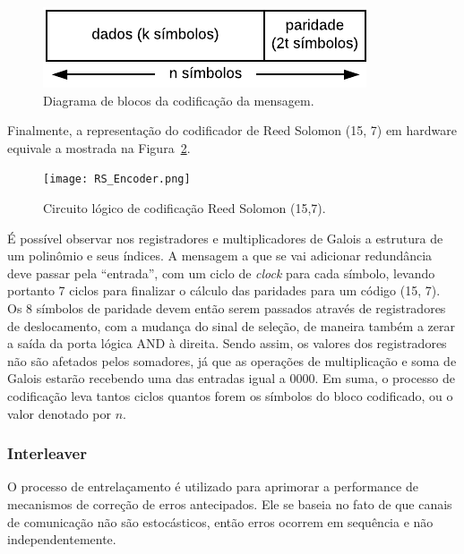 	\begin{figure}[!htb]
		\caption{\label{fig_reed_solomon_message}Diagrama de blocos da codificação da mensagem.}
		\centering
		\includegraphics[width=0.4\textheight]{frame/rs-codeword.pdf}
	\end{figure}

	Finalmente, a representação do codificador de Reed Solomon (15, 7) em hardware equivale a mostrada na Figura~\ref{fig:reedsolomon}.

	\begin{figure}[!htb]
		\caption{\label{RS_encoder_logic}Circuito lógico de codificação Reed Solomon (15,7).}
		\centering
		\texttt{[image: RS\_Encoder.png]}
		\label{fig:reedsolomon}
	\end{figure}

	É possível observar nos registradores e multiplicadores de Galois a estrutura de um polinômio e seus índices. A mensagem a que se vai adicionar redundância deve passar pela ``entrada'', com um ciclo de \textit{clock} para cada símbolo, levando portanto 7 ciclos para finalizar o cálculo das paridades para um código (15, 7). Os 8 símbolos de paridade devem então serem passados através de registradores de deslocamento, com a mudança do sinal de seleção, de maneira também a zerar a saída da porta lógica AND à direita. Sendo assim, os valores dos registradores não são afetados pelos somadores, já que as operações de multiplicação e soma de Galois estarão recebendo uma das entradas igual a 0000. Em suma, o processo de codificação leva tantos ciclos quantos forem os símbolos do bloco codificado, ou o valor denotado por $n$.


	\subsubsection{Interleaver}

	O processo de entrelaçamento é utilizado para aprimorar a performance de mecanismos de correção de erros antecipados. Ele se baseia no fato de que canais de comunicação não são estocásticos, então erros ocorrem em sequência e não independentemente.


